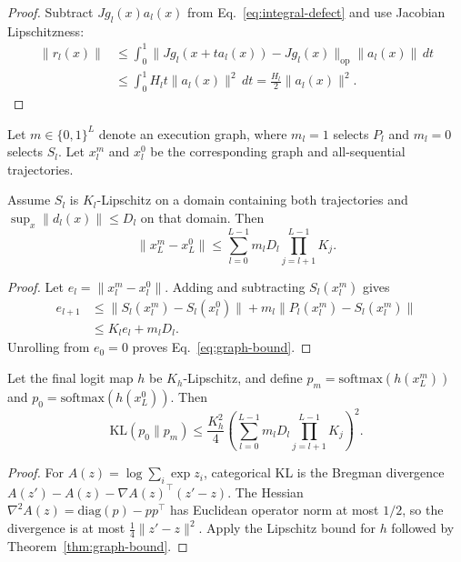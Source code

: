 \begin{proof}
Subtract $Jg_l(x)a_l(x)$ from Eq.~\eqref{eq:integral-defect} and use Jacobian Lipschitzness:
\begin{align}
  \|r_l(x)\|
  &\le \int_0^1
  \|Jg_l(x+t a_l(x))-Jg_l(x)\|_{\mathrm{op}}\|a_l(x)\|\,dt\\
  &\le \int_0^1 H_l t\|a_l(x)\|^2\,dt
  =\frac{H_l}{2}\|a_l(x)\|^2.
\end{align}
\end{proof}

Let $m\in\{0,1\}^L$ denote an execution graph, where $m_l=1$ selects $P_l$ and $m_l=0$ selects $S_l$. Let $x_l^m$ and $x_l^0$ be the corresponding graph and all-sequential trajectories.

\begin{theorem}
\label{thm:graph-bound}
Assume $S_l$ is $K_l$-Lipschitz on a domain containing both trajectories and $\sup_x\|d_l(x)\|\le D_l$ on that domain. Then
\begin{equation}
  \|x_L^m-x_L^0\|
  \le
  \sum_{l=0}^{L-1}m_lD_l\prod_{j=l+1}^{L-1}K_j.
  \label{eq:graph-bound}
\end{equation}
\end{theorem}

\begin{proof}
Let $e_l=\|x_l^m-x_l^0\|$. Adding and subtracting $S_l(x_l^m)$ gives
\begin{align}
  e_{l+1}
  &\le \|S_l(x_l^m)-S_l(x_l^0)\|
  +m_l\|P_l(x_l^m)-S_l(x_l^m)\|\\
  &\le K_l e_l+m_lD_l.
\end{align}
Unrolling from $e_0=0$ proves Eq.~\eqref{eq:graph-bound}.
\end{proof}

\begin{theorem}
\label{thm:kl-bound}
Let the final logit map $h$ be $K_h$-Lipschitz, and define $p_m=\mathrm{softmax}(h(x_L^m))$ and $p_0=\mathrm{softmax}(h(x_L^0))$. Then
\begin{equation}
  \mathrm{KL}(p_0\|p_m)
  \le \frac{K_h^2}{4}
  \left(
    \sum_{l=0}^{L-1}m_lD_l\prod_{j=l+1}^{L-1}K_j
  \right)^2.
  \label{eq:kl-bound}
\end{equation}
\end{theorem}

\begin{proof}
For $A(z)=\log\sum_i\exp z_i$, categorical KL is the Bregman divergence $A(z')-A(z)-\nabla A(z)^\top(z'-z)$. The Hessian $\nabla^2A(z)=\mathrm{diag}(p)-pp^\top$ has Euclidean operator norm at most $1/2$, so the divergence is at most $\frac14\|z'-z\|^2$. Apply the Lipschitz bound for $h$ followed by Theorem~\ref{thm:graph-bound}.
\end{proof}

